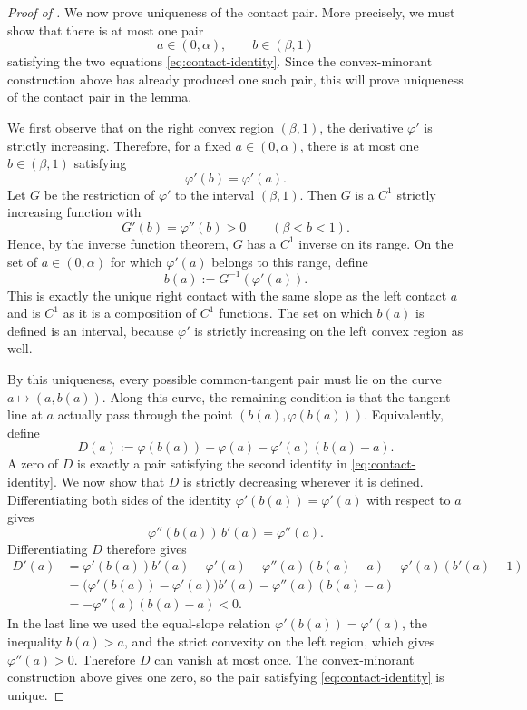 \begin{proof}[Proof of ]
We now prove uniqueness of the contact pair.  More precisely, we must
show that there is at most one pair
\[
  a\in(0,\alpha),\qquad b\in(\beta,1)
\]
satisfying the two equations
\eqref{eq:contact-identity}.  Since the convex-minorant
construction above has already produced one such pair, this will prove
uniqueness of the contact pair in the lemma.

We first observe that on the right convex region $(\beta,1)$, the derivative
$\varphi'$ is strictly increasing.  Therefore, for a fixed
$a\in(0,\alpha)$, there is at most one $b\in(\beta,1)$ satisfying
\[
  \varphi'(b)=\varphi'(a).
\]
Let $G$ be the restriction of $\varphi'$ to the interval $(\beta,1)$.  Then
$G$ is a $C^1$ strictly increasing function with
\[
  G'(b)=\varphi''(b)>0\qquad(\beta<b<1).
\]
Hence, by the inverse function theorem, $G$ has a $C^1$ inverse on its range.
On the set of $a\in(0,\alpha)$ for which
$\varphi'(a)$ belongs to this range, define
\[
  b(a):=G^{-1}(\varphi'(a)).
\]
This is exactly the unique right contact with the same slope as the left
contact $a$ and is $C^1$ as it is a composition of $C^1$ functions.
The set on which $b(a)$ is defined is an interval, because
$\varphi'$ is strictly increasing on the left convex region as well.

By this uniqueness, every possible common-tangent pair must lie on the curve
$a\mapsto(a,b(a))$.
Along this curve, the remaining condition is that the
tangent line at $a$ actually pass through the point $(b(a),\varphi(b(a)))$.
Equivalently, define
\[
  D(a):=\varphi(b(a))-\varphi(a)-\varphi'(a)(b(a)-a).
\]
A zero of $D$ is exactly a pair satisfying the second identity in
\eqref{eq:contact-identity}.  We now show that $D$ is strictly decreasing wherever
it is defined.  Differentiating both sides of the identity
$\varphi'(b(a))=\varphi'(a)$ with respect to $a$ gives
\[
  \varphi''(b(a))\,b'(a)=\varphi''(a).
\]
Differentiating $D$ therefore gives
\begin{align*}
  D'(a)
  &=
  \varphi'(b(a))b'(a)-\varphi'(a)
  -\varphi''(a)(b(a)-a)
  -\varphi'(a)(b'(a)-1)\\
  &=
  \bigl(\varphi'(b(a))-\varphi'(a)\bigr)b'(a)
  -\varphi''(a)(b(a)-a)\\
  &=
  -\varphi''(a)(b(a)-a)<0.
\end{align*}
In the last line we used the equal-slope relation
$\varphi'(b(a))=\varphi'(a)$, the inequality $b(a)>a$, and the strict
convexity on the left region, which gives $\varphi''(a)>0$.  Therefore $D$ can
vanish at most once.  The convex-minorant construction above gives one zero,
so the pair satisfying \eqref{eq:contact-identity} is
unique.


\end{proof}

